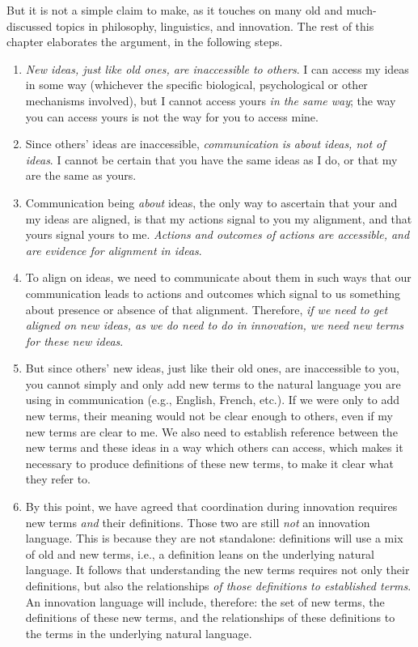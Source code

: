 But it is not a simple claim to make, as it touches on many old and much-discussed topics in philosophy, linguistics, and innovation. The rest of this chapter elaborates the argument, in the following steps.
\begin{enumerate}
	\item \textit{New ideas, just like old ones, are inaccessible to others}. I can access my ideas in some way (whichever the specific biological, psychological or other mechanisms involved), but I cannot access yours \textit{in the same way}; the way you can access yours is not the way for you to access mine.
	\item Since others' ideas are inaccessible, \textit{communication is about ideas, not of ideas}. I cannot be certain that you have the same ideas as I do, or that my are the same as yours.
	\item Communication being \textit{about} ideas, the only way to ascertain that your and my ideas are aligned, is that my actions signal to you my alignment, and that yours signal yours to me. \textit{Actions and outcomes of actions are accessible, and are evidence for alignment in ideas}.
	\item To align on ideas, we need to communicate about them in such ways that our communication leads to actions and outcomes which signal to us something about presence or absence of that alignment. Therefore, \textit{if we need to get aligned on new ideas, as we do need to do in innovation, we need new terms for these new ideas}.
	\item But since others' new ideas, just like their old ones, are inaccessible to you, you cannot simply and only add new terms to the natural language you are using in communication (e.g., English, French, etc.). If we were only to add new terms, their meaning would not be clear enough to others, even if my new terms are clear to me. We also need to establish reference between the new terms and these ideas in a way which others can access, which makes it necessary to produce definitions of these new terms, to make it clear what they refer to.
	\item By this point, we have agreed that coordination during innovation requires new terms \textit{and} their definitions. Those two are still \textit{not} an innovation language. This is because they are not standalone: definitions will use a mix of old and new terms, i.e., a definition leans on the underlying natural language. It follows that understanding the new terms requires not only their definitions, but also the relationships\textit{ of those definitions to established terms}. An innovation language will include, therefore: the set of new terms, the definitions of these new terms, and the relationships of these definitions to the terms in the underlying natural language.

\end{enumerate}
